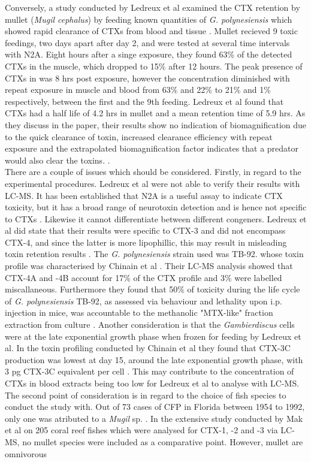 \documentclass[12pt]{article}
\begin{document}
Conversely, a study conducted by Ledreux et al examined the CTX retention by mullet (\emph{Mugil cephalus}) by feeding known quantities of \emph{G. polynesiensis} which showed rapid clearance of CTXs from blood and tissue \cite{ledreux2014dynamics}. 
Mullet recieved 9 toxic feedings, two days apart after day 2, and were tested at several time intervals with N2A. Eight hours after a singe exposure, they found 63\% of the detected CTXs in the muscle, which dropped to 15\% after 12 hours. The peak presence of CTXs in was 8 hrs post exposure, however the concentration diminished with repeat exposure in muscle and blood from 63\% and 22\% to 21\% and 1\% respectively, between the first and the 9th feeding. Ledreux et al found that CTXs had a half life of 4.2 hrs in mullet and a mean retention time of 5.9 hrs. As they discuss in the paper, their results show no indication of biomagnification due to the quick clearance of toxin, increased clearance efficiency with repeat exposure and the extrapolated biomagnification factor indicates that a predator would also clear the toxins.  \cite{ledreux2014dynamics}. \\
There are a couple of issues which should be considered. Firstly, in regard to the experimental procedures. Ledreux et al were not able to verify their results with LC-MS. It has been established that N2A is a useful assay to indicate CTX toxicity, but it has a broad range of neurotoxin detection and is  hence not specific to CTXs \cite{ebesu2012comment}. Likewise it cannot differentiate between different congeners. Ledreux et al did state that their results were specific to CTX-3 and did not encompass CTX-4, and since the latter is more lipophillic, this may result in misleading toxin retention results \cite{ledreux2014dynamics}. The \emph{G. polynesiensis} strain used was TB-92. whose toxin profile was characterised by Chinain et al \cite{chinain2010growth}. Their LC-MS analysis showed that CTX-4A and -4B account for 17\% of the CTX profile and 3\% were labelled miscallaneous. Furthermore they found that 50\% of toxicity during the life cycle of \emph{G. polynesiensis} TB-92, as assessed via behaviour and lethality upon i.p. injection in mice, was accountable to the methanolic "MTX-like" fraction extraction from culture \cite{chinain2010growth}. Another consideration is that the \emph{Gambierdiscus} cells were at the late exponential growth phase when frozen for feeding by Ledreux et al. In the toxin profiling conducted by Chinain et al they found that CTX-3C production was lowest at day 15, around the late exponential growth phase, with 3 pg CTX-3C equivalent per cell \cite{chinain2010growth}. This may contribute to the concentration of CTXs in blood extracts being too low for Ledreux et al to analyse with LC-MS. \\
The second point of consideration is in regard to the choice of fish species to conduct the study with. Out of 73 cases of CFP in Florida between 1954 to 1992, only one was atributed to a \emph{Mugil} sp. \cite{de1994distribution}. In the extensive study conducted by Mak et al on 205 coral reef fishes which were analysed for CTX-1, -2 and -3 via LC-MS, no mullet species were included as a comparative point. However, mullet are omnivorous 
\end{document}
